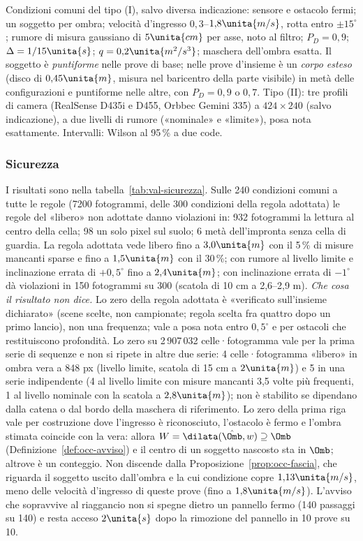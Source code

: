 Condizioni comuni del tipo (I), salvo diversa indicazione: sensore e ostacolo fermi; un soggetto per ombra; velocità d'ingresso $0{,}3$–$1{,}8\unita{m/s}$, rotta entro $\pm15^\circ$; rumore di misura gaussiano di $5\unita{cm}$ per asse, noto al filtro; $P_D=0{,}9$; $\Delta=1/15\unita{s}$; $q=0{,}2\unita{m^2/s^3}$; maschera dell'ombra esatta. Il soggetto è \emph{puntiforme} nelle prove di base; nelle prove d'insieme è un \emph{corpo esteso} (disco di $0{,}45\unita{m}$, misura nel baricentro della parte visibile) in metà delle configurazioni e puntiforme nelle altre, con $P_D=0{,}9$ o $0{,}7$. Tipo (II): tre profili di camera (RealSense D435i e D455, Orbbec Gemini 335) a $424\times240$ (salvo indicazione), a due livelli di rumore («nominale» e «limite»), posa nota esattamente. Intervalli: Wilson al 95\,\% a due code.

\subsubsection*{Sicurezza}

I risultati sono nella tabella~\ref{tab:val-sicurezza}. Sulle 240 condizioni comuni a tutte le regole (7200 fotogrammi, delle 300 condizioni della regola adottata) le regole del «libero» non adottate danno violazioni in: 932 fotogrammi la lettura al centro della cella; 98 un solo pixel sul suolo; 6 metà dell'impronta senza cella di guardia. La regola adottata vede libero fino a $3{,}0\unita{m}$ con il 5\,\% di misure mancanti sparse e fino a $1{,}5\unita{m}$ con il 30\,\%; con rumore al livello limite e inclinazione errata di $+0{,}5^\circ$ fino a $2{,}4\unita{m}$; con inclinazione errata di $-1^\circ$ dà violazioni in 150 fotogrammi su 300 (scatola di 10 cm a 2,6–2,9 m). \emph{Che cosa il risultato non dice.} Lo zero della regola adottata è «verificato sull'insieme dichiarato» (scene scelte, non campionate; regola scelta fra quattro dopo un primo lancio), non una frequenza; vale a posa nota entro $0{,}5^\circ$ e per ostacoli che restituiscono profondità. Lo zero su 2\,907\,032 celle·fotogramma vale per la prima serie di sequenze e non si ripete in altre due serie: 4 celle·fotogramma «libero» in ombra vera a 848 px (livello limite, scatola di 15 cm a $2\unita{m}$) e 5 in una serie indipendente (4 al livello limite con misure mancanti 3,5 volte più frequenti, 1 al livello nominale con la scatola a $2{,}8\unita{m}$); non è stabilito se dipendano dalla catena o dal bordo della maschera di riferimento. Lo zero della prima riga vale per costruzione dove l'ingresso è riconosciuto, l'ostacolo è fermo e l'ombra stimata coincide con la vera: allora $W=\dilata(\hat\Omb,w)\supseteq\Omb$ (Definizione~\ref{def:occ-avviso}) e il centro di un soggetto nascosto sta in $\Omb$; altrove è un conteggio. Non discende dalla Proposizione~\ref{prop:occ-fascia}, che riguarda il soggetto uscito dall'ombra e la cui condizione copre $1{,}13\unita{m/s}$, meno delle velocità d'ingresso di queste prove (fino a $1{,}8\unita{m/s}$). L'avviso che sopravvive al riaggancio non si spegne dietro un pannello fermo (140 passaggi su 140) e resta acceso $2\unita{s}$ dopo la rimozione del pannello in 10 prove su 10.

